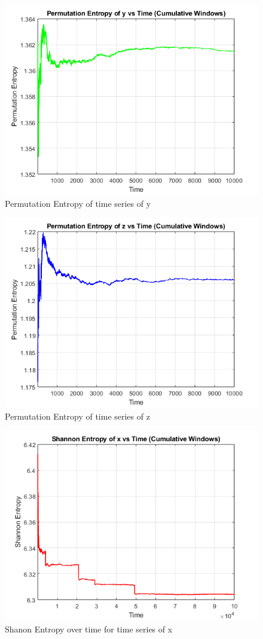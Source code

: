 \documentclass[%
reprint,
amsmath,amssymb,
aps,
floatfix,
]{revtex4-2}
\begin{document}
	\begin{figure}[htbp]
	\centering
	\includegraphics[width=0.8\linewidth]{PE_vs_time_y.png}
	\caption{Permutation Entropy of time series of y}
	\label{fig:vx_vz}
\end{figure}	
	\begin{figure}[htbp]
	\centering
	\includegraphics[width=0.8\linewidth]{PE_vs_time_z.png}
	\caption{Permutation Entropy of time series of z}
	\label{fig:vx_vz}
\end{figure}
	\begin{figure}[htbp]
		\centering
		\includegraphics[width=0.8\linewidth]{SE_vs_time_x.png}
		\caption{Shanon Entropy over time for time series of x}
		\label{fig:vx_vz}
	\end{figure}
\end{document}

